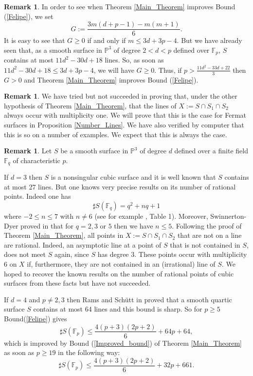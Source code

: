 \documentclass[12pt]{amsart}
\theoremstyle{definition}
\newtheorem{remark}[lemma]{Remark}
\newcommand{\PP}{{\mathbb P}}
\def\PP{\mathbb{P}}
\begin{document}
\begin{remark}
In order to see  when Theorem \ref{Main_Theorem}  improves Bound (\ref{Felipe}), 
we set 
$$G:=\frac{3m(d+p-1)-m(m+1)}{6}.$$
It is easy to see that $G\geq 0$ if and only if $m\leq 3d+3p-4$.
But we have already seen that, as a smooth surface in ${\mathbb P}^3$ of degree $2<d<p$ defined over ${\mathbb F}_p$, $S$ contains at most $11d^2-30d+18$ lines. So, as soon as $11d^2-30d+18\leq 3d+3p-4$, we will have $G\geq 0$. Thus, if $p> \frac{11d^2-33d+22}{3}$ then $G> 0$ and Theorem \ref{Main_Theorem}  improves Bound (\ref{Felipe}).
\end{remark}

\begin{remark}
We have tried but not succeeded in proving that, under the other hypothesis of Theorem \ref{Main_Theorem}, that the lines of $X:=S\cap S_1\cap S_2$ always occur with multiplicity one. We will prove that this is the case for Fermat surfaces in Proposition \ref{Number_Lines}. We have also verified by computer that this is so on a number of examples. We expect that this is always the case.

\end{remark}


\begin{remark}
Let $S$ be a smooth surface in $\PP^3$ of degree $d$ defined over a finite field ${\mathbb F}_q$ of characteristic $p$.

If $d=3$ then $S$ is a nonsingular cubic surface and it is well known that $S$ contains at most 27 lines. But one knows very precise results on its number of rational points. Indeed one has
$$\sharp S({\mathbb F}_q) = q^2+nq+1$$
where $-2\leq n\leq 7$ with $n\not=6$  (see for example \cite{Manin}, Table 1).
 Moreover, Swinnerton-Dyer proved in \cite{SW} that 
for $q=2,3$ or $5$ then we have $n\leq 5$. Following the proof of Theorem \ref{Main_Theorem}, all points in $X:=S\cap S_1\cap S_2$ that are not on a line are rational. Indeed, an asymptotic line at a point of $S$ that is not contained in $S$, does not meet $S$ again, since $S$ has degree $3$. These points occur with multiplicity $6$ on $X$ if, furthermore, they are not contained in an (irrational) line of $S$. We hoped to recover the known results on the number of rational points of cubic surfaces from these facts but have not succeeded.

If $d=4$ and $p\not=2,3$ then Rams and Sch\"utt in \cite{R-S} proved that a smooth quartic surface $S$ contains at most 64 lines and this bound is sharp.
So for $p\geq 5$
Bound(\ref{Felipe}) gives
$$\sharp S({\mathbb F}_p) \leq \frac{4(p+3)(2p+2)}{6}
+64p+64,$$
which is improved by Bound (\ref{Improved_bound}) of Theorem \ref{Main_Theorem}
as soon as $p\geq 19$ in the following way:
$$\sharp S({\mathbb F}_p) \leq \frac{4(p+3)(2p+2)}{6}
+32p+661.$$


\end{remark}
\end{document}
